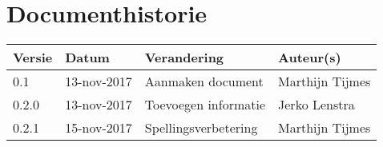 \section{Documenthistorie}

\begin{tabularx}{\textwidth}{| l | l | X | l |}
	\hline
	\textbf{Versie} & \textbf{Datum} & \textbf{Verandering} & \textbf{Auteur(s)} \\ \hline
	0.1	& 13-nov-2017 & Aanmaken document & Marthijn Tijmes \\ \hline
    0.2.0 & 13-nov-2017 & Toevoegen informatie & Jerko Lenstra \\ \hline
    0.2.1 & 15-nov-2017 & Spellingsverbetering & Marthijn Tijmes \\ \hline

\end{tabularx}
